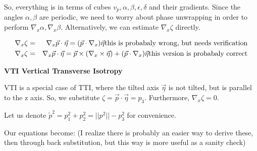 \documentclass[12pt]{article}
\begin{document}
So, everything is in terms of cubes $v_p,\alpha,\beta,\epsilon,\delta$ and their gradients.
Since the angles $\alpha,\beta$ are periodic, we need to worry about phase unwrapping in order to perform $\nabla_x \alpha,\nabla_x \beta$. Alternatively, we can estimate $\nabla_x \zeta$ directly. 

\begin{eqnarray}
\nabla_x \zeta  &=&  \nabla_x \vec{p} \cdot \vec{\eta} = (\vec{p} \cdot \nabla_x) \vec{\eta} \hbox{this is probabaly wrong, but needs verification} \nonumber \\
\nabla_x \zeta  &=&  \nabla_x \vec{p} \cdot \vec{\eta} = \vec{p} \times (\nabla_x \times \vec{\eta}) + (\vec{p} \cdot \nabla_x) \vec{\eta} \hbox{this version is probabaly correct} \nonumber
\end{eqnarray}

\textbf{VTI Vertical Transverse Isotropy}

VTI is a special case of TTI, where the tilted axis $\vec{\eta}$ is not tilted, but is parallel to the z axis. So, we substitute $\zeta = \vec{p} \cdot \vec{\eta} = p_3$. Furthermore, $\nabla_x \zeta = 0$.

Let us denote $\tilde{p}^2=p_1^2+p_2^2=||p^2||-p_3^2$ for convenience. 

Our equations become: (I realize there is probably an easier way to derive these, then through back substitution, but this way is more useful as a sanity check)
\end{document}

